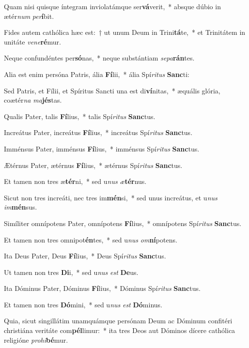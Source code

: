 \item Quam nisi quisque íntegram inviolatámque ser\textbf{vá}verit,~* absque dúbio in ætér\textit{num} \textit{per}\textbf{í}bit.
\item Fides autem cathólica hæc est:~† ut unum Deum in Trini\textbf{tá}te,~* et Trinitátem in unitáte \textit{ve}\textit{ne}\textbf{ré}mur.
\item Neque confundéntes per\textbf{só}nas,~* neque substántiam \textit{se}\textit{pa}\textbf{rán}tes.
\item Alia est enim persóna Patris, ália \textbf{Fí}lii,~* ália Spí\textit{ri}\textit{tus} \textbf{Sanc}ti:
\item Sed Patris, et Fílii, et Spíritus Sancti una est di\textbf{ví}nitas,~* æquális glória, coætér\textit{na} \textit{ma}\textbf{jés}tas.
\item Qualis Pater, talis \textbf{Fí}lius,~* talis Spí\textit{ri}\textit{tus} \textbf{Sanc}tus.
\item Increátus Pater, increátus \textbf{Fí}lius,~* increátus Spí\textit{ri}\textit{tus} \textbf{Sanc}tus.
\item Imménsus Pater, imménsus \textbf{Fí}lius,~* imménsus Spí\textit{ri}\textit{tus} \textbf{Sanc}tus.
\item Ætérnus Pater, ætérnus \textbf{Fí}lius,~* ætérnus Spí\textit{ri}\textit{tus} \textbf{Sanc}tus.
\item Et tamen non tres æ\textbf{tér}ni,~* sed u\textit{nus} \textit{æ}\textbf{tér}nus.
\item Sicut non tres increáti, nec tres im\textbf{mén}si,~* sed unus increátus, et u\textit{nus} \textit{im}\textbf{mén}sus.
\item Simíliter omnípotens Pater, omnípotens \textbf{Fí}lius,~* omnípotens Spí\textit{ri}\textit{tus} \textbf{Sanc}tus.
\item Et tamen non tres omnipot\textbf{én}tes,~* sed u\textit{nus} \textit{om}\textbf{ní}potens.
\item Ita Deus Pater, Deus \textbf{Fí}lius,~* Deus Spí\textit{ri}\textit{tus} \textbf{Sanc}tus.
\item Ut tamen non tres \textbf{Di}i,~* sed u\textit{nus} \textit{est} \textbf{De}us.
\item Ita Dóminus Pater, Dóminus \textbf{Fí}lius,~* Dóminus Spí\textit{ri}\textit{tus} \textbf{Sanc}tus.
\item Et tamen non tres \textbf{Dó}mini,~* sed u\textit{nus} \textit{est} \textbf{Dó}minus.
\item Quia, sicut singillátim unamquámque persónam Deum ac Dóminum confitéri christiána veritáte com\textbf{pél}limur:~* ita tres Deos aut Dóminos dícere cathólica religióne \textit{pro}\textit{hi}\textbf{bé}mur.
